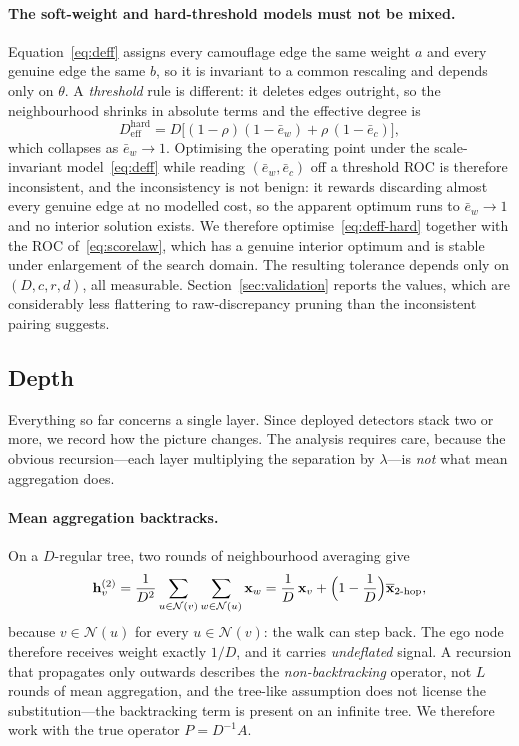 \documentclass[../elsevier.tex]{subfiles}
\begin{document}
\paragraph{The soft-weight and hard-threshold models must not be mixed.}
Equation~\eqref{eq:deff} assigns every camouflage edge the same weight $a$ and every
genuine edge the same $b$, so it is invariant to a common rescaling and depends only
on $\theta$. A \emph{threshold} rule is different: it deletes edges outright, so the
neighbourhood shrinks in absolute terms and the effective degree is
\begin{equation}
    D^{\mathrm{hard}}_{\mathrm{eff}}
    = D\bigl[(1-\rho)(1-\bar e_w) + \rho\,(1-\bar e_c)\bigr] ,
    \label{eq:deff-hard}
\end{equation}
which collapses as $\bar e_w \to 1$. Optimising the operating point under the
scale-invariant model~\eqref{eq:deff} while reading $(\bar e_w, \bar e_c)$ off a
threshold ROC is therefore inconsistent, and the inconsistency is not benign: it
rewards discarding almost every genuine edge at no modelled cost, so the apparent
optimum runs to $\bar e_w \to 1$ and no interior solution exists. We therefore
optimise~\eqref{eq:deff-hard} together with the ROC of~\eqref{eq:scorelaw}, which has
a genuine interior optimum and is stable under enlargement of the search domain.
The resulting tolerance depends only on $(D, c, r, d)$, all measurable.
Section~\ref{sec:validation} reports the values, which are considerably less
flattering to raw-discrepancy pruning than the inconsistent pairing suggests.

\subsection{Depth}
\label{sec:depth}

Everything so far concerns a single layer. Since deployed detectors stack two or
more, we record how the picture changes. The analysis requires care, because the
obvious recursion---each layer multiplying the separation by $\lambda$---is
\emph{not} what mean aggregation does.

\paragraph{Mean aggregation backtracks.}
On a $D$-regular tree, two rounds of neighbourhood averaging give
\begin{equation}
    \mathbf{h}^{(2)}_v
    = \frac{1}{D^2}\sum_{u\in\mathcal{N}(v)}\sum_{w\in\mathcal{N}(u)}\mathbf{x}_w
    = \frac{1}{D}\,\mathbf{x}_v
      + \Bigl(1-\frac{1}{D}\Bigr)\overline{\mathbf{x}}_{2\text{-hop}} ,
    \label{eq:backtrack}
\end{equation}
because $v \in \mathcal{N}(u)$ for every $u \in \mathcal{N}(v)$: the walk can step
back. The ego node therefore receives weight exactly $1/D$, and it carries
\emph{undeflated} signal. A recursion that propagates only outwards describes the
\emph{non-backtracking} operator, not $L$ rounds of mean aggregation, and the
tree-like assumption does not license the substitution---the backtracking term is
present on an infinite tree. We therefore work with the true operator
$P = D^{-1}A$.
\end{document}
